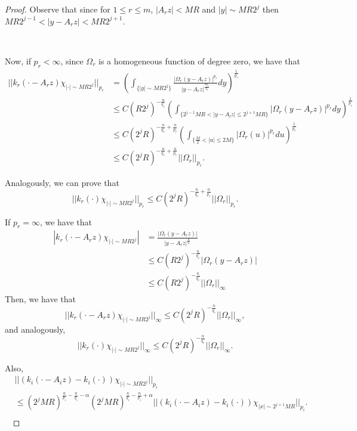 \documentclass[a4paper,12pt,reqno]{amsart}
\numberwithin{equation}{section}
\begin{document}
\begin{proof}
		
		Observe that since  for $1 \leq  r\leq m$, $|A_rz| <M R $ and $|y|\sim   MR2^j $  then $MR 2^{j-1}<|y-A_rz|< MR2^{j+1}$.
		
		\ 
		
		Now, if $p_r<\infty$, since $\Omega_r$ is a homogeneous function of degree zero, we have that
		\begin{equation}
			\begin{aligned}
				||k_r(\cdot-A_rz)\chi _{|\cdot|\sim M R2^{j}}||_{p_r}&=
				\left(\int_{\{|y|\sim M R2^{j}\}} \frac{|\Omega_{r}(y-A_rz)|^{p_r}}{|y-A_rz|^{\frac{np_r}{q_r}}}dy\right)^{\frac 1{p_r}}\\
				&\leq C (R2^j)^{-\frac{n}{q_r}}\left(\int_{\{2^{j-1}MR<|y-A_lz|\leq 2^{j+1}MR\}}|\Omega_{r}(y-A_rz)|^{p_r}dy\right)^{\frac 1{p_r}}\\
				&\leq C (2^jR)^{-\frac{n}{q_r}+\frac n{p_r}}\left(\int_{\{\frac M2<|u|\leq 2M\}}|\Omega_{r}(u)|^{p_r}du\right)^{\frac 1{p_r}}\\
				&\leq C (2^jR)^{-\frac{n}{q_r}+\frac n{p_r}}||\Omega_r||_{p_r}.
			\end{aligned}
		\end{equation}
		
		
		Analogously, we can prove that 
		$$||k_r(\cdot)\chi _{|\cdot|\sim M R2^{j}}||_{p_r} \leq C (2^jR)^{-\frac{n}{q_r}+\frac n{p_r}}||\Omega_r||_{p_r}.$$
		
		
		If $p_r=\infty$, we have that 
		\begin{equation}
			\begin{aligned}
				|k_r(\cdot-A_rz)\chi _{|\cdot|\sim M R2^{j}}|&=
				\frac{|\Omega_{r}(y-A_rz)|}{|y-A_rz|^{\frac{n}{q_r}}}\\
				&\leq C (R2^j)^{-\frac{n}{q_r}} |\Omega_{r}(y-A_rz)|\\
				&\leq C (R2^j)^{-\frac{n}{q_r}} ||\Omega_{r}||_{\infty}
			\end{aligned}
		\end{equation}
		Then, we have that 
		$$||k_r(\cdot-A_rz)\chi _{|\cdot|\sim M R2^{j}}||_{\infty} \leq C (2^jR)^{-\frac{n}{q_r}}||\Omega_r||_{\infty},$$
		and analogously, 
		$$||k_r(\cdot)\chi _{|\cdot|\sim M R2^{j}}||_{\infty} \leq C (2^jR)^{-\frac{n}{q_r}}||\Omega_r||_{\infty}.$$
		
		Also,
		$$
		\begin{aligned}
			& ||(k_i(\cdot-A_iz )-k_i(\cdot))\chi_{|\cdot|\sim M R2^{j}}||_{p_i}\\
			& \leq ( 2^jMR)^{\frac n{p_i}-\frac n{q_i}-\alpha}( 2^jMR)^{\frac n{q_i}-\frac n{p_i}+\alpha}||(k_i(\cdot-A_i z)-k_i(\cdot) )\chi_{|x|\sim 2^{j+1}MR}||_{p_i}.\\
		\end{aligned}
		$$
		\
		

\end{proof}
\end{document}
